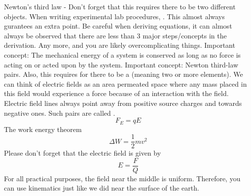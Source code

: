\markdownRendererInterblockSeparator
{}Newton's third law - Don't forget that this requires there to be two different objects.\markdownRendererInterblockSeparator
{}\markdownRendererInterblockSeparator
{}\markdownRendererUlBeginTight
\markdownRendererUlItem When writing experimental lab procedures, . This almost always gurantees an extra point.\markdownRendererUlItemEnd 
\markdownRendererUlItem Be careful when deriving equations, it can almost always be observed that there are less than 3 major steps/concepts in the derivation. Any more, and you are likely overcomplicating things.\markdownRendererUlItemEnd 
\markdownRendererUlItem Important concept: The mechanical energy of a system is conserved as long as no force is acting on or acted upon by the system.\markdownRendererUlItemEnd 
\markdownRendererUlItem Important concept: Newton third-law pairs. Also, this requires for there to be a  (meaning two or more elements).\markdownRendererUlItemEnd 
\markdownRendererUlEndTight \markdownRendererInterblockSeparator
{}\markdownRendererInterblockSeparator
{}\markdownRendererUlBegin
\markdownRendererUlItem We can think of electric fields as an area permeated space where any mass placed in this field would experience a force because of an interaction with the field.\markdownRendererUlItemEnd 
\markdownRendererUlItem Electric field lines always point away from positive source charges and towards negative ones. Such pairs are called .\markdownRendererUlItemEnd 
\markdownRendererUlEnd \markdownRendererInterblockSeparator
{}$$ F_E = qE $$\markdownRendererInterblockSeparator
{}\markdownRendererUlBegin
\markdownRendererUlItem The work energy theorem $$\Delta W = \frac{1}{2}mv^2$$\markdownRendererUlItemEnd 
\markdownRendererUlItem Please don't forget that the electric field is given by $$E = \frac{F}{Q}$$\markdownRendererUlItemEnd 
\markdownRendererUlEnd \markdownRendererInterblockSeparator
{}\markdownRendererInterblockSeparator
{}For all practical purposes, the field near the middle is uniform. Therefore, you can use kinematics just like we did near the surface of the earth.\markdownRendererInterblockSeparator
{}\markdownRendererInterblockSeparator
{}\markdownRendererUlBeginTight
